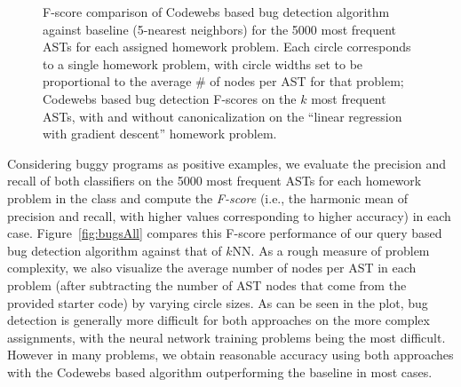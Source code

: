 \begin{figure}[t!]
\center
\qquad\qquad
{}

\caption[Bug detection accuracy]{
  F-score comparison of Codewebs based bug detection algorithm against baseline (5-nearest neighbors) 
for the 5000 most frequent ASTs for each assigned homework problem.  Each circle corresponds to a single homework problem, 
with circle widths  set to be proportional to the average \# of nodes per AST for that problem; 
 Codewebs based bug detection F-scores on the $k$ most frequent ASTs, with and without canonicalization
on the ``linear regression with gradient descent'' homework problem.
}
\label{fig:exp2}
\end{figure}


Considering buggy programs as positive examples, we evaluate the precision and recall
of both classifiers on the 5000 most frequent ASTs for each homework problem in the class
and compute the \emph{F-score} (i.e., the harmonic mean of precision and recall, with higher values
corresponding to higher accuracy) in each case.
Figure~\ref{fig:bugsAll} compares this F-score performance of our query based bug detection
algorithm against that of $k$NN.   As a rough measure of problem complexity, we also visualize
 the average number of nodes per AST in each problem (after subtracting
the number of AST nodes that come from the provided starter code) by varying circle sizes.
As can be seen in the plot, bug detection is generally more difficult for both approaches on the more
complex assignments, with the neural network training problems being the most difficult.
However in many problems, we obtain reasonable accuracy using both approaches with
the Codewebs based algorithm outperforming the baseline in most cases.

